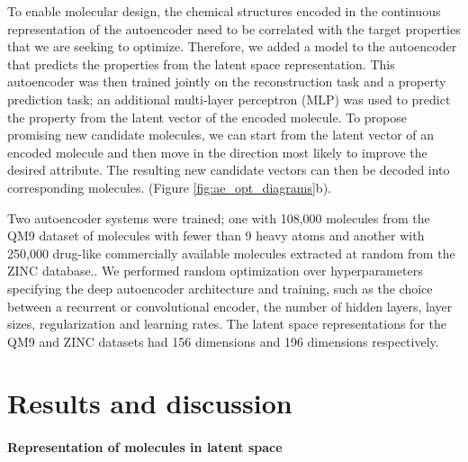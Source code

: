 To enable molecular design, the chemical structures encoded in the continuous representation of the autoencoder need to be correlated with the target properties that we are seeking to optimize. Therefore, we added a model to the autoencoder that predicts the properties from the latent space representation. This autoencoder was then trained jointly on the reconstruction task and a property prediction task; an additional multi-layer perceptron (MLP) was used to predict the property from the latent vector of the encoded molecule. To propose promising new candidate molecules, we can start from the latent vector of an encoded molecule and then move in the direction most likely to improve the desired attribute. The resulting new candidate vectors can then be decoded into corresponding molecules. (Figure \ref{fig:ae_opt_diagrams}b).

Two autoencoder systems were trained; one with 108,000 molecules from the QM9 dataset of molecules with fewer than 9 heavy atoms \cite{ramakrishnan2014quantum} and another with 250,000 drug-like commercially available molecules extracted at random from the ZINC database.\cite{irwin_2012_zinc}. We performed random optimization over hyperparameters specifying the deep autoencoder architecture and training, such as the choice between a recurrent or convolutional encoder, the number of hidden layers, layer sizes, regularization and learning rates. 
The latent space representations for the QM9 and ZINC datasets had 156 dimensions and 196 dimensions respectively.

\section{Results and discussion}
\paragraph{Representation of molecules in latent space}

